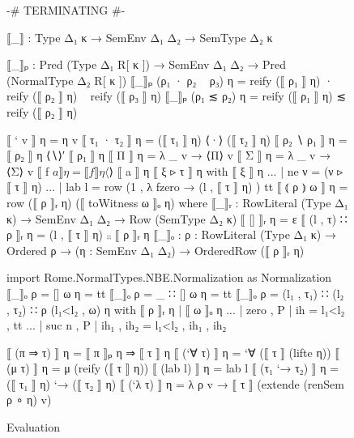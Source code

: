\begin{figure}
\begin{AgdaAlign}
\begin{code}[hide]
  {-# TERMINATING #-}
\end{code}
\begin{code}
  ⟦_⟧ : Type Δ₁ κ → SemEnv Δ₁ Δ₂ → SemType Δ₂ κ
\end{code}
\begin{code}[hide]
  ⟦_⟧ₚ : Pred (Type Δ₁ R[ κ ]) → SemEnv Δ₁ Δ₂ → Pred (NormalType Δ₂ R[ κ ])
  ⟦_⟧ₚ (ρ₁ · ρ₂ ~ ρ₃) η = reify (⟦ ρ₁ ⟧ η) · reify (⟦ ρ₂ ⟧ η) ~ reify (⟦ ρ₃ ⟧ η)
  ⟦_⟧ₚ (ρ₁ ≲ ρ₂) η = reify (⟦ ρ₁ ⟧ η) ≲ reify (⟦ ρ₂ ⟧ η)
\end{code}
\begin{code}
  ⟦ ` v ⟧ η       = η v
  ⟦ τ₁ · τ₂ ⟧ η   = (⟦ τ₁ ⟧ η) ⟨·⟩ (⟦ τ₂ ⟧ η)
  ⟦ ρ₂ ∖ ρ₁ ⟧ η = ⟦ ρ₂ ⟧ η ⟨∖⟩′ ⟦ ρ₁ ⟧ η
  ⟦ Π ⟧ η         = λ _ v → ⟨Π⟩ v
  ⟦ Σ ⟧ η         = λ _ v → ⟨Σ⟩ v
  ⟦ f $ a ⟧ η     = ⟦ f ⟧ η ⟨$⟩ ⟦ a ⟧ η
  ⟦ ξ ▹ τ ⟧ η with ⟦ ξ ⟧ η 
  ... | ne ν       = (ν ▹ ⟦ τ ⟧ η)
  ... | lab l      = row (1 , λ { fzero → (l , ⟦ τ ⟧ η) }) tt
  ⟦ ⦅ ρ ⦆ ω ⟧ η   = row 
    (⟦ ρ ⟧ᵣ η) 
    (⟦ toWitness ω ⟧ₒ η)
    where
      ⟦_⟧ᵣ : RowLiteral (Type Δ₁ κ) → 
            SemEnv Δ₁ Δ₂ → 
            Row (SemType Δ₂ κ)
      ⟦ [] ⟧ᵣ η          = ε
      ⟦ (l , τ) ∷ ρ ⟧ᵣ η = (l , ⟦ τ ⟧ η) ⨾⨾ ⟦ ρ ⟧ᵣ η
      ⟦_⟧ₒ : {ρ : RowLiteral (Type Δ₁ κ)} → 
             Ordered ρ → 
             (η : SemEnv Δ₁ Δ₂) → 
             OrderedRow (⟦ ρ ⟧ᵣ η)      
\end{code}
\begin{code}[hide]
      import Rome.NormalTypes.NBE.Normalization as Normalization
      ⟦_⟧ₒ {ρ = []} ω η = tt
      ⟦_⟧ₒ {ρ = _ ∷ []} ω η = tt
      ⟦_⟧ₒ {ρ = (l₁ , τ₁) ∷ (l₂ , τ₂) ∷ ρ} (l₁<l₂ , ω) η with 
            ⟦ ρ ⟧ᵣ η  | ⟦ ω ⟧ₒ η 
      ... | zero , P  | ih = l₁<l₂ , tt
      ... | suc n , P | ih₁ , ih₂ =  l₁<l₂ , ih₁ , ih₂

  ⟦ (π ⇒ τ) ⟧ η = ⟦ π ⟧ₚ η ⇒ ⟦ τ ⟧ η
  ⟦ (`∀ τ) ⟧ η = `∀ (⟦ τ ⟧ (lifte η)) 
  ⟦ (μ τ) ⟧ η = μ (reify (⟦ τ ⟧ η))
  ⟦ (lab l) ⟧ η = lab l
  ⟦ (τ₁ `→ τ₂) ⟧ η = (⟦ τ₁ ⟧ η) `→ (⟦ τ₂ ⟧ η)
  ⟦ (`λ τ) ⟧ η = λ ρ v → ⟦ τ ⟧ (extende (renSem ρ ∘ η) v)
\end{code}
\end{AgdaAlign}
\caption{Evaluation}
\label{fig:evaluation}
\end{figure}


